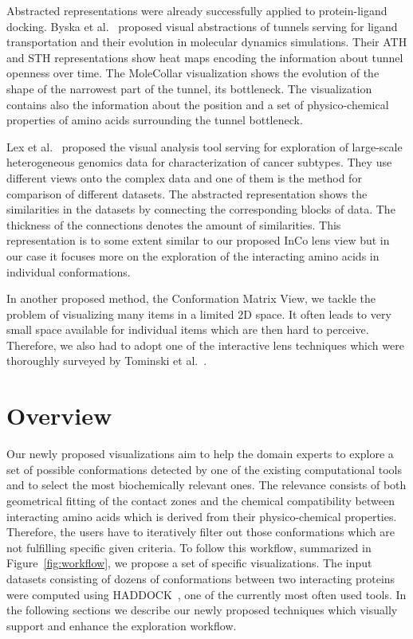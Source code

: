\documentclass[journal]{vgtc}                %
\begin{document}
Abstracted representations were already successfully applied to protein-ligand docking.
Byska et al.~\cite{Byska2015} proposed visual abstractions of tunnels serving for ligand transportation and their evolution in molecular dynamics simulations.
Their ATH and STH representations show heat maps encoding the information about tunnel openness over time.
The MoleCollar visualization shows the evolution of the shape of the narrowest part of the tunnel, its bottleneck.
The visualization contains also the information about the position and a set of physico-chemical properties of amino acids surrounding the tunnel bottleneck.

Lex et al.~\cite{Lex2012} proposed the visual analysis tool serving for exploration of large-scale heterogeneous genomics data for characterization of cancer subtypes.
They use different views onto the complex data and one of them is the method for comparison of different datasets.
The abstracted representation shows the similarities in the datasets by connecting the corresponding blocks of data. 
The thickness of the connections denotes the amount of similarities.
This representation is to some extent similar to our proposed InCo lens view but in our case it focuses more on the exploration of the interacting amino acids in individual conformations.

In another proposed method, the Conformation Matrix View, we tackle the problem of visualizing many items in a limited 2D space.
It often leads to very small space available for individual items which are then hard to perceive.
Therefore, we also had to adopt one of the interactive lens techniques which were thoroughly surveyed by Tominski et al.~\cite{Tominski2014}.


\section{Overview}
Our newly proposed visualizations aim to help the domain experts to explore a set of possible conformations detected by one of the existing computational tools and to select the most biochemically relevant ones.
The relevance consists of both geometrical fitting of the contact zones and the chemical compatibility between interacting amino acids which is derived from their physico-chemical properties.
Therefore, the users have to iteratively filter out those conformations which are not fulfilling specific given criteria.
To follow this workflow, summarized in Figure~\ref{fig:workflow}, we propose a set of specific visualizations. 
The input datasets consisting of dozens of conformations between two interacting proteins were computed using HADDOCK~\cite{haddock}, one of the currently most often used tools.
In the following sections we describe our newly proposed techniques which visually support and enhance the exploration workflow.
\end{document}
